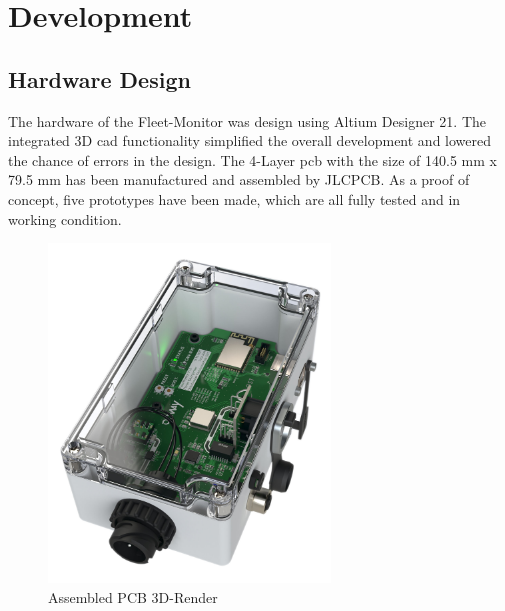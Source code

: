 \chapter{Development}

\section{Hardware Design}
The hardware of the Fleet-Monitor was design using Altium Designer 21. The integrated 3D \acrshort{cad} functionality simplified the overall development and lowered the chance of errors in the design. The 4-Layer \acrfull{pcb} with the size of 140.5 mm x 79.5 mm has been manufactured and assembled by JLCPCB.\newline
As a proof of concept, five prototypes have been made, which are all fully tested and in working condition.

\medskip
\begin{figure}[h!]
	\centering
	\includegraphics[height=9cm]{images/fleet-monitor-rendering}
	\caption{Assembled PCB 3D-Render}
	\label{fig:fleet-monitor-rendering}
\end{figure}

